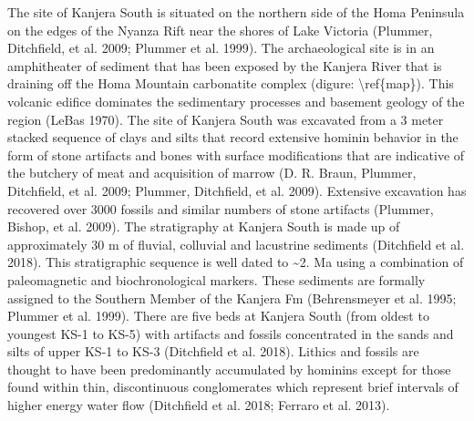 \documentclass[]{elsarticle} %
\begin{document}
The site of Kanjera South is situated on the northern side of the Homa
Peninsula on the edges of the Nyanza Rift near the shores of Lake
Victoria (Plummer, Ditchfield, et al. 2009; Plummer et al. 1999). The
archaeological site is in an amphitheater of sediment that has been
exposed by the Kanjera River that is draining off the Homa Mountain
carbonatite complex (digure: \textbackslash{}ref\{map\}). This volcanic
edifice dominates the sedimentary processes and basement geology of the
region (LeBas 1970). The site of Kanjera South was excavated from a 3
meter stacked sequence of clays and silts that record extensive hominin
behavior in the form of stone artifacts and bones with surface
modifications that are indicative of the butchery of meat and
acquisition of marrow (D. R. Braun, Plummer, Ditchfield, et al. 2009;
Plummer, Ditchfield, et al. 2009). Extensive excavation has recovered
over 3000 fossils and similar numbers of stone artifacts (Plummer,
Bishop, et al. 2009). The stratigraphy at Kanjera South is made up of
approximately 30 m of fluvial, colluvial and lacustrine sediments
(Ditchfield et al. 2018). This stratigraphic sequence is well dated to
\textasciitilde{}2. Ma using a combination of paleomagnetic and
biochronological markers. These sediments are formally assigned to the
Southern Member of the Kanjera Fm (Behrensmeyer et al. 1995; Plummer et
al. 1999). There are five beds at Kanjera South (from oldest to youngest
KS-1 to KS-5) with artifacts and fossils concentrated in the sands and
silts of upper KS-1 to KS-3 (Ditchfield et al. 2018). Lithics and
fossils are thought to have been predominantly accumulated by hominins
except for those found within thin, discontinuous conglomerates which
represent brief intervals of higher energy water flow (Ditchfield et al.
2018; Ferraro et al. 2013).
\end{document}
